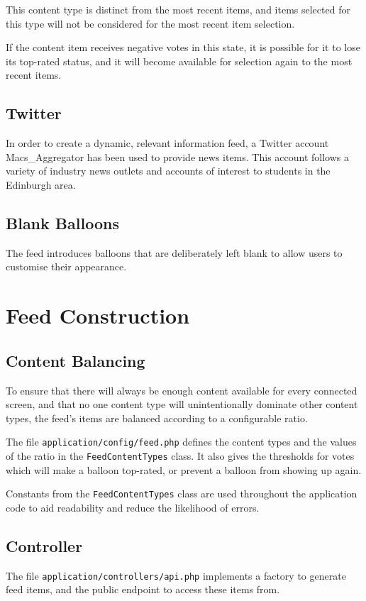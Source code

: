 \documentclass[11pt]{article}
\begin{document}
This content type is distinct from the most recent items, and items selected for this type will not be considered for the most recent item selection.

If the content item receives negative votes in this state, it is possible for it to lose its top-rated status, and it will become available for selection again to the most recent items.

\subsection{Twitter}
In order to create a dynamic, relevant information feed, a Twitter account Macs\_Aggregator has been used to provide news items. This account follows a variety of industry news outlets and accounts of interest to students in the Edinburgh area.

\subsection{Blank Balloons}
The feed introduces balloons that are deliberately left blank to allow users to customise their appearance.

\section{Feed Construction}

\subsection{Content Balancing}
To ensure that there will always be enough content available for every connected screen, and that no one content type will unintentionally dominate other content types, the feed's items are balanced according to a configurable ratio.

The file \texttt{application/config/feed.php} defines the content types and the values of the ratio in the \texttt{FeedContentTypes} class. It also gives the thresholds for votes which will make a balloon top-rated, or prevent a balloon from showing up again.

Constants from the \texttt{FeedContentTypes} class are used throughout the application code to aid readability and reduce the likelihood of errors.

\subsection{Controller}
The file \texttt{application/controllers/api.php} implements a factory to generate feed items, and the public endpoint to access these items from.
\end{document}
